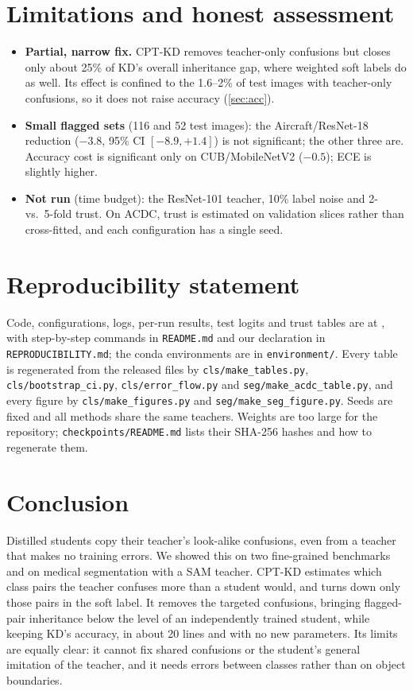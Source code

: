 \documentclass[10pt,twocolumn,letterpaper]{article}
\begin{document}
\section{Limitations and honest assessment}
\label{sec:limits}
\begin{itemize}
\item \textbf{Partial, narrow fix.} CPT-KD removes teacher-only confusions but closes only about 25\% of KD's overall inheritance gap, where weighted soft labels do as well. Its effect is confined to the 1.6--2\% of test images with teacher-only confusions, so it does not raise accuracy (\cref{sec:acc}).
\item \textbf{Small flagged sets} (116 and 52 test images): the Aircraft/ResNet-18 reduction ($-3.8$, 95\% CI $[-8.9,+1.4]$) is not significant; the other three are. Accuracy cost is significant only on CUB/MobileNetV2 ($-0.5$); ECE is slightly higher.
\item \textbf{Not run} (time budget): the ResNet-101 teacher, 10\% label noise and 2- vs.\ 5-fold trust. On ACDC, trust is estimated on validation slices rather than cross-fitted, and each configuration has a single seed.
\end{itemize}

\section{Reproducibility statement}
\label{sec:repro}
Code, configurations, logs, per-run results, test logits and trust tables are at \repourl, with step-by-step commands in \texttt{README.md} and our declaration in \texttt{REPRODUCIBILITY.md}; the conda environments are in \texttt{environment/}. Every table is regenerated from the released files by \texttt{cls/make\_tables.py}, \texttt{cls/bootstrap\_ci.py}, \texttt{cls/error\_flow.py} and \texttt{seg/make\_acdc\_table.py}, and every figure by \texttt{cls/make\_figures.py} and \texttt{seg/make\_seg\_figure.py}. Seeds are fixed and all methods share the same teachers. Weights are too large for the repository; \texttt{checkpoints/README.md} lists their SHA-256 hashes and how to regenerate them.

\section{Conclusion}
Distilled students copy their teacher's look-alike confusions, even from a teacher that makes no training errors. We showed this on two fine-grained benchmarks and on medical segmentation with a SAM teacher. CPT-KD estimates which class pairs the teacher confuses more than a student would, and turns down only those pairs in the soft label. It removes the targeted confusions, bringing flagged-pair inheritance below the level of an independently trained student, while keeping KD's accuracy, in about 20 lines and with no new parameters. Its limits are equally clear: it cannot fix shared confusions or the student's general imitation of the teacher, and it needs errors between classes rather than on object boundaries.


{\small


}
\end{document}
